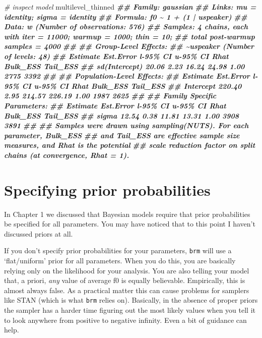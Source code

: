 \documentclass[
]{book}
\newenvironment{Shaded}{\begin{snugshade}}{\end{snugshade}}
\newcommand{\CommentTok}[1]{\textcolor[rgb]{0.56,0.35,0.01}{\textit{#1}}}
\newcommand{\DocumentationTok}[1]{\textcolor[rgb]{0.56,0.35,0.01}{\textbf{\textit{#1}}}}
\newcommand{\NormalTok}[1]{#1}
\begin{document}
\begin{Shaded}
\begin{Highlighting}[]
\CommentTok{\# inspect model}
\NormalTok{multilevel\_thinned}
\DocumentationTok{\#\#  Family: gaussian }
\DocumentationTok{\#\#   Links: mu = identity; sigma = identity }
\DocumentationTok{\#\# Formula: f0 \textasciitilde{} 1 + (1 | uspeaker) }
\DocumentationTok{\#\#    Data: w (Number of observations: 576) }
\DocumentationTok{\#\# Samples: 4 chains, each with iter = 11000; warmup = 1000; thin = 10;}
\DocumentationTok{\#\#          total post{-}warmup samples = 4000}
\DocumentationTok{\#\# }
\DocumentationTok{\#\# Group{-}Level Effects: }
\DocumentationTok{\#\# \textasciitilde{}uspeaker (Number of levels: 48) }
\DocumentationTok{\#\#               Estimate Est.Error l{-}95\% CI u{-}95\% CI Rhat Bulk\_ESS Tail\_ESS}
\DocumentationTok{\#\# sd(Intercept)    20.06      2.23    16.24    24.98 1.00     2775     3392}
\DocumentationTok{\#\# }
\DocumentationTok{\#\# Population{-}Level Effects: }
\DocumentationTok{\#\#           Estimate Est.Error l{-}95\% CI u{-}95\% CI Rhat Bulk\_ESS Tail\_ESS}
\DocumentationTok{\#\# Intercept   220.40      2.95   214.57   226.19 1.00     1987     2625}
\DocumentationTok{\#\# }
\DocumentationTok{\#\# Family Specific Parameters: }
\DocumentationTok{\#\#       Estimate Est.Error l{-}95\% CI u{-}95\% CI Rhat Bulk\_ESS Tail\_ESS}
\DocumentationTok{\#\# sigma    12.54      0.38    11.81    13.31 1.00     3908     3891}
\DocumentationTok{\#\# }
\DocumentationTok{\#\# Samples were drawn using sampling(NUTS). For each parameter, Bulk\_ESS}
\DocumentationTok{\#\# and Tail\_ESS are effective sample size measures, and Rhat is the potential}
\DocumentationTok{\#\# scale reduction factor on split chains (at convergence, Rhat = 1).}
\end{Highlighting}
\end{Shaded}

\hypertarget{specifying-prior-probabilities}{%
\section{Specifying prior probabilities}\label{specifying-prior-probabilities}}

In Chapter 1 we discussed that Bayesian models require that prior probabilities be specified for all parameters. You may have noticed that to this point I haven't discussed priors at all.

If you don't specify prior probabilities for your parameters, \texttt{brm} will use a `flat/uniform' prior for all parameters. When you do this, you are basically relying only on the likelihood for your analysis. You are also telling your model that, a priori, \emph{any} value of average f0 is equally believable. Empirically, this is almost always false. As a practical matter this can cause problems for samplers like STAN (which is what \texttt{brm} relies on). Basically, in the absence of proper priors the sampler has a harder time figuring out the most likely values when you tell it to look anywhere from positive to negative infinity. Even a bit of guidance can help.
\end{document}
